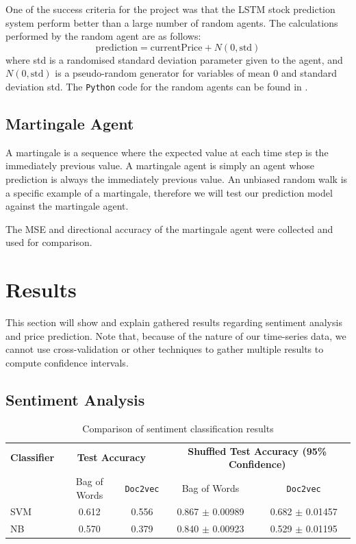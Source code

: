 \documentclass[12pt,a4paper,twoside,openright]{report}
\begin{document}
One of the success criteria for the project was that the LSTM stock prediction
system perform better than a large number of random agents. The calculations
performed by the random agent are as follows:
\begin{equation}
	\text{prediction} = \text{currentPrice} + N(0,\text{std})
\end{equation}
where std is a randomised standard deviation parameter given to the agent,
and $N(0,\text{std})$ is a pseudo-random generator for variables of mean $0$
and standard deviation std. The \texttt{Python} code
for the random agents can be found in .

\subsection{Martingale Agent}

A martingale is a sequence where the expected value at each time step is
the immediately previous value. A martingale agent is simply an agent whose prediction
is always the immediately previous value.
An unbiased random walk is a specific example
of a martingale, therefore we will test our prediction model against the martingale
agent.

The MSE and directional
accuracy of the martingale agent were collected and used for comparison.

\section{Results}
This section will show and explain gathered results regarding sentiment analysis and 
price prediction. Note that, because of the nature of our time-series data, we cannot use
cross-validation or other techniques to gather multiple results to compute
confidence intervals.

\subsection{Sentiment Analysis}
\label{sec:evalSenti}

\begin{table}[H]
\centering
\begin{tabular}{lcccc} 
\toprule
\textbf{Classifier} & \multicolumn{2}{c}{\textbf{Test Accuracy}} & \multicolumn{2}{c}{\textbf{Shuffled Test Accuracy (95\% Confidence)}} \bigstrut\\
                                  & Bag of Words & \texttt{Doc2vec} & Bag of Words & \texttt{Doc2vec} \bigstrut\\ \hline
SVM                               & 0.612        & 0.556  & 0.867 $\pm$ 0.00989      & 0.682 $\pm$ 0.01457 \bigstrut\\
NB                                & 0.570        & 0.379  & 0.840 $\pm$ 0.00923      & 0.529 $\pm$ 0.01195 \bigstrut\\
\bottomrule
\end{tabular}
\caption{Comparison of sentiment classification results}
\label{table:sentiResults}
\end{table}
\end{document}
